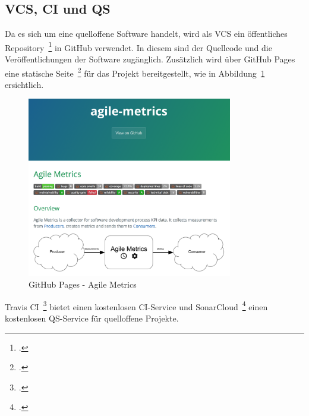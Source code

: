 \subsection{\ac{VCS}, \ac{CI} und \ac{QS}}

Da es sich um eine quelloffene Software handelt, wird als \ac{VCS} ein öffentliches Repository~\footcite{agile_metrics_repo} in GitHub verwendet.
In diesem sind der Quellcode und die Veröffentlichungen der Software zugänglich.
Zusätzlich wird über GitHub Pages eine statische Seite~\footcite{agile_metrics_page} für das Projekt bereitgestellt, wie in Abbildung~\ref{fig:github_pages} ersichtlich.

\begin{savenotes}
    \begin{figure}[H] 
        \centering
            \includegraphics[width=0.8\textwidth]{img/github-pages.png}
        \caption{GitHub Pages - Agile Metrics}\label{fig:github_pages}
    \end{figure}
\end{savenotes}

Travis CI~\footcite{travis_agile_metrics} bietet einen kostenlosen \ac{CI}-Service und SonarCloud~\footcite{sonarcloud_agile_metrics} einen kostenlosen \ac{QS}-Service für quelloffene Projekte.

